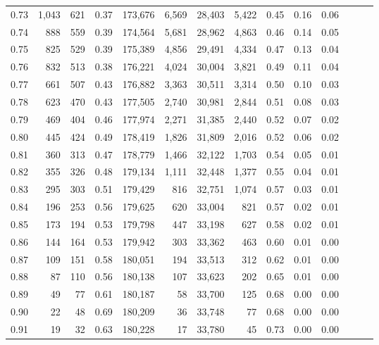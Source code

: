 \begin{tabular}{rrrrrrrrrrrrrr}
0.73 &  1,043 &  621 &  0.37 &  173,676 &    6,569 &  28,403 &   5,422 &  0.45 &  0.16 &      0.06 \\
0.74 &    888 &  559 &  0.39 &  174,564 &    5,681 &  28,962 &   4,863 &  0.46 &  0.14 &      0.05 \\
0.75 &    825 &  529 &  0.39 &  175,389 &    4,856 &  29,491 &   4,334 &  0.47 &  0.13 &      0.04 \\
0.76 &    832 &  513 &  0.38 &  176,221 &    4,024 &  30,004 &   3,821 &  0.49 &  0.11 &      0.04 \\
0.77 &    661 &  507 &  0.43 &  176,882 &    3,363 &  30,511 &   3,314 &  0.50 &  0.10 &      0.03 \\
0.78 &    623 &  470 &  0.43 &  177,505 &    2,740 &  30,981 &   2,844 &  0.51 &  0.08 &      0.03 \\
0.79 &    469 &  404 &  0.46 &  177,974 &    2,271 &  31,385 &   2,440 &  0.52 &  0.07 &      0.02 \\
0.80 &    445 &  424 &  0.49 &  178,419 &    1,826 &  31,809 &   2,016 &  0.52 &  0.06 &      0.02 \\
0.81 &    360 &  313 &  0.47 &  178,779 &    1,466 &  32,122 &   1,703 &  0.54 &  0.05 &      0.01 \\
0.82 &    355 &  326 &  0.48 &  179,134 &    1,111 &  32,448 &   1,377 &  0.55 &  0.04 &      0.01 \\
0.83 &    295 &  303 &  0.51 &  179,429 &      816 &  32,751 &   1,074 &  0.57 &  0.03 &      0.01 \\
0.84 &    196 &  253 &  0.56 &  179,625 &      620 &  33,004 &     821 &  0.57 &  0.02 &      0.01 \\
0.85 &    173 &  194 &  0.53 &  179,798 &      447 &  33,198 &     627 &  0.58 &  0.02 &      0.01 \\
0.86 &    144 &  164 &  0.53 &  179,942 &      303 &  33,362 &     463 &  0.60 &  0.01 &      0.00 \\
0.87 &    109 &  151 &  0.58 &  180,051 &      194 &  33,513 &     312 &  0.62 &  0.01 &      0.00 \\
0.88 &     87 &  110 &  0.56 &  180,138 &      107 &  33,623 &     202 &  0.65 &  0.01 &      0.00 \\
0.89 &     49 &   77 &  0.61 &  180,187 &       58 &  33,700 &     125 &  0.68 &  0.00 &      0.00 \\
0.90 &     22 &   48 &  0.69 &  180,209 &       36 &  33,748 &      77 &  0.68 &  0.00 &      0.00 \\
0.91 &     19 &   32 &  0.63 &  180,228 &       17 &  33,780 &      45 &  0.73 &  0.00 &      0.00 \\

\end{tabular}
